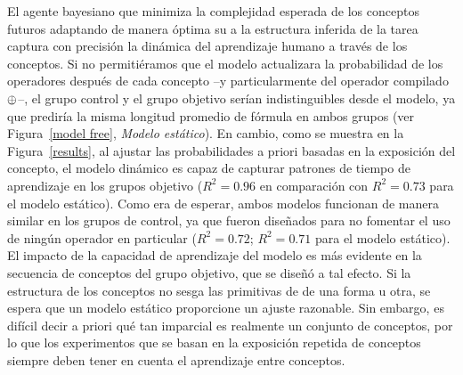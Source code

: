 El agente bayesiano que minimiza la complejidad esperada de los conceptos futuros adaptando de manera óptima su \lot a la estructura inferida de la tarea captura con precisión la dinámica del aprendizaje humano a través de los conceptos. Si no permitiéramos que el modelo actualizara la probabilidad de los operadores después de cada concepto --y particularmente del operador compilado $ \oplus $--, el grupo control y el grupo objetivo serían indistinguibles desde el modelo, ya que prediría la misma longitud promedio de fórmula en ambos grupos (ver Figura~\ref{model free}, {\em Modelo estático}). En cambio, como se muestra en la Figura~\ref{results}, al ajustar las probabilidades a priori basadas en la exposición del concepto, el modelo dinámico es capaz de capturar patrones de tiempo de aprendizaje en los grupos objetivo ($ R^{2} = 0.96 $ en comparación con $ R^{2} = 0.73 $ para el modelo estático). Como era de esperar, ambos modelos funcionan de manera similar en los grupos de control, ya que fueron diseñados para no fomentar el uso de ningún operador en particular ($ R^{2} = 0.72 $; $ R^{2} = 0.71 $ para el modelo estático). El impacto de la capacidad de aprendizaje del modelo es más evidente en la secuencia de conceptos del grupo objetivo, que se diseñó a tal efecto. Si la estructura de los conceptos no sesga las primitivas de \lot de una forma u otra, se espera que un modelo estático proporcione un ajuste razonable. Sin embargo, es difícil decir a priori qué tan imparcial es realmente un conjunto de conceptos, por lo que los experimentos que se basan en la exposición repetida de conceptos siempre deben tener en cuenta el aprendizaje entre conceptos.

